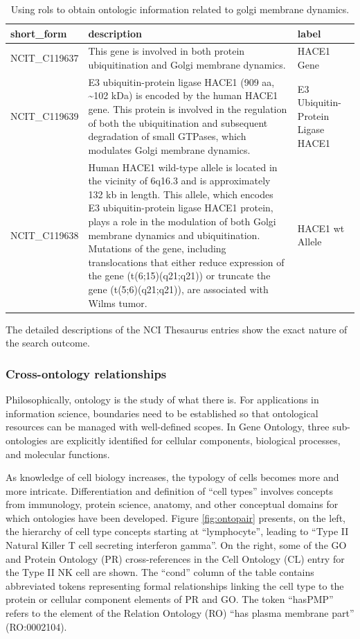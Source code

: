 \documentclass[graybox]{svmult}
\begin{document}
\begin{table}
\caption{Using rols to obtain ontologic information related to
golgi membrane dynamics. \label{tab:tab-golg}}
\begin{tabular}{lp{5cm}p{8cm}}
\toprule
short\_form & description & label\\
\midrule
NCIT\_C119637 & This gene is involved in both protein ubiquitination and Golgi membrane dynamics. & HACE1 Gene\\
NCIT\_C119639 & E3 ubiquitin-protein ligase HACE1 (909 aa, \textasciitilde{}102 kDa) is encoded by the human HACE1 gene. This protein is involved in the regulation of both the ubiquitination and subsequent degradation of small GTPases, which modulates Golgi membrane dynamics. & E3 Ubiquitin-Protein Ligase HACE1\\
NCIT\_C119638 & Human HACE1 wild-type allele is located in the vicinity of 6q16.3 and is approximately 132 kb in length. This allele, which encodes E3 ubiquitin-protein ligase HACE1 protein, plays a role in the modulation of both Golgi membrane dynamics and ubiquitination. Mutations of the gene, including translocations that either reduce expression of the gene (t(6;15)(q21;q21)) or truncate the gene (t(5;6)(q21;q21)), are associated with Wilms tumor. & HACE1 wt Allele\\
\bottomrule
\end{tabular}
\end{table}

The detailed descriptions of the NCI Thesaurus entries show
the exact nature of the search outcome.

\subsubsection{Cross-ontology relationships}\label{cross-ontology-relationships}

Philosophically, ontology is the study of what there is. For
applications in information
science,
boundaries need to be established so that ontological
resources can be managed with well-defined scopes. In Gene
Ontology, three sub-ontologies are explicitly identified for
cellular components, biological processes, and molecular functions.

As knowledge of cell biology increases, the typology of
cells becomes more and more intricate. Differentiation
and definition
of ``cell types'' involves concepts from immunology,
protein science, anatomy, and other conceptual domains
for which ontologies have been developed. Figure \ref{fig:ontopair}
presents, on the left, the hierarchy of cell type concepts starting at ``lymphocyte'',
leading to ``Type II Natural Killer T cell secreting interferon gamma''.
On the right, some of the GO and Protein Ontology (PR) cross-references
in the Cell Ontology (CL) entry for the Type II NK cell are shown.
The ``cond'' column of the table contains abbreviated tokens
representing formal relationships linking the cell type
to the protein or cellular component elements of PR and GO.
The token ``hasPMP'' refers to the element of the Relation Ontology
(RO) ``has plasma membrane part'' (RO:0002104).
\end{document}

